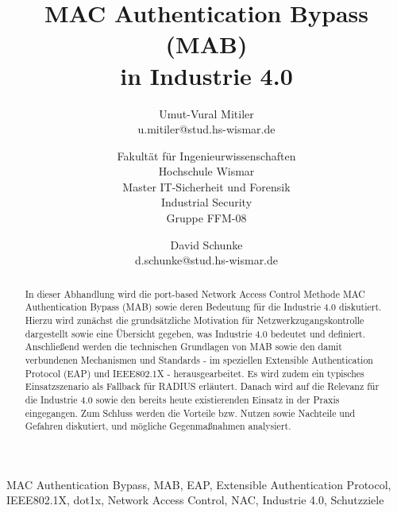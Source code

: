 \documentclass[conference]{IEEEtran}
\begin{document}
\title{MAC Authentication Bypass (MAB)\\ in Industrie 4.0}
\author{
	Umut-Vural Mitiler\\
	u.mitiler@stud.hs-wismar.de
	\and
	Fakultät für Ingenieurwissenschaften\\
	Hochschule Wismar\\
	Master IT-Sicherheit und Forensik\\
	Industrial Security\\
	Gruppe FFM-08
	\and
	David Schunke\\
	d.schunke@stud.hs-wismar.de
}

\maketitle

\thispagestyle{plain}
\pagestyle{plain}

%


%

\begin{abstract}
In dieser Abhandlung wird die port-based Network Access Control Methode MAC Authentication Bypass (MAB) sowie deren Bedeutung für die Industrie 4.0 diskutiert. Hierzu wird zunächst die grundsätzliche Motivation für Netzwerkzugangskontrolle dargestellt sowie eine Übersicht gegeben, was Industrie 4.0 bedeutet und definiert. Anschließend werden die technischen Grundlagen von MAB sowie den damit verbundenen Mechanismen und Standards - im speziellen Extensible Authentication Protocol (EAP) und IEEE802.1X - herausgearbeitet. Es wird zudem ein typisches Einsatzszenario als Fallback für RADIUS erläutert. Danach wird auf die Relevanz für die Industrie 4.0 sowie den bereits heute existierenden Einsatz in der Praxis eingegangen. Zum Schluss werden die Vorteile bzw. Nutzen sowie Nachteile und Gefahren diskutiert, und mögliche Gegenmaßnahmen analysiert. 
\end{abstract}

\vspace{1em}

\begin{IEEEkeywords}
MAC Authentication Bypass, MAB, EAP, Extensible Authentication Protocol, IEEE802.1X, dot1x, Network Access Control, NAC, Industrie 4.0, Schutzziele
\end{IEEEkeywords}

%
\end{document}
